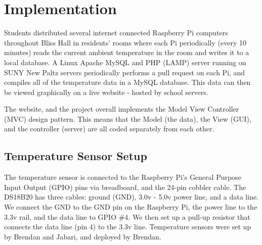 \documentclass{article}
\begin{document}
			
	\newpage
	\section{Implementation}\label{sec:implementation}
	
		Students distributed several internet connected Raspberry Pi computers throughout Bliss Hall in residents' rooms
		where each Pi periodically (every 10 minutes) reads the current ambient temperature in the room and writes it to a local database. A 
		Linux Apache MySQL and PHP (LAMP) server running on SUNY New Paltz servers periodically performs a pull request on
		each Pi, and compiles all of the temperature data in a MySQL database. This data can then be viewed graphically on a 
		live website - hosted by school servers.	
		
		The website, and the project overall implements the Model View Controller (MVC) design pattern. This means that the Model (the data),
		the View (GUI), and the controller (server) are all coded separately from each other. 
		
			
	\newpage
			
		\subsection{Temperature Sensor Setup}	
			The temperature sensor is connected to the Raspberry Pi's General Purpose Input Output (GPIO) pins via breadboard, 
			and the 24-pin cobbler cable. The DS18B20 has three cables: ground (GND), 3.0v - 5.0v power line, and a data line. 
			We connect the GND to the GND pin on the Raspberry Pi, the power line to the 3.3v rail, and the data line to GPIO \#4.
		 	We then set up a pull-up resistor that connects the data line (pin 4) to the 3.3v line. Temperature sensors were set
		 	up by Brendan and Jabari, and deployed by Brendan.
							
\end{document}
